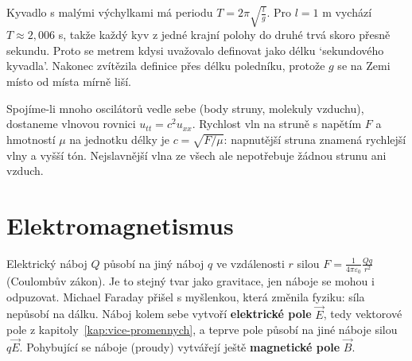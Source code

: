 \begin{example}
  Kyvadlo s malými výchylkami má periodu $T = 2\pi\sqrt{\frac{l}{g}}$. Pro $l = 1$ m vychází $T\approx 2{,}006$ s, takže každý kyv z jedné krajní polohy do druhé trvá skoro přesně sekundu. Proto se metrem kdysi uvažovalo definovat jako délku `sekundového kyvadla'. Nakonec zvítězila definice přes délku poledníku, protože $g$ se na Zemi místo od místa mírně liší.
\end{example}

Spojíme-li mnoho oscilátorů vedle sebe (body struny, molekuly vzduchu), dostaneme vlnovou rovnici $u_{tt} = c^2u_{xx}$. Rychlost vln na struně s napětím $F$ a hmotností $\mu$ na jednotku délky je $c = \sqrt{F/\mu}$: napnutější struna znamená rychlejší vlny a vyšší tón. Nejslavnější vlna ze všech ale nepotřebuje žádnou strunu ani vzduch.

\section{Elektromagnetismus}

Elektrický náboj $Q$ působí na jiný náboj $q$ ve vzdálenosti $r$ silou $F = \frac{1}{4\pi\varepsilon_0}\frac{Qq}{r^2}$ (Coulombův zákon). Je to stejný tvar jako gravitace, jen náboje se mohou i odpuzovat. Michael Faraday přišel s myšlenkou, která změnila fyziku: síla nepůsobí na dálku. Náboj kolem sebe vytvoří \textbf{elektrické pole} $\vec{E}$, tedy vektorové pole z kapitoly~\ref{kap:vice-promennych}, a teprve pole působí na jiné náboje silou $q\vec{E}$. Pohybující se náboje (proudy) vytvářejí ještě \textbf{magnetické pole} $\vec{B}$.

\begin{center}
\end{center}

